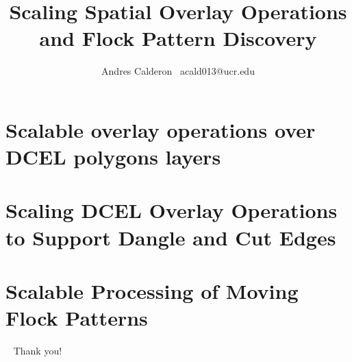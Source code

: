\documentclass{beamer}
\title{\LARGE Scaling Spatial Overlay Operations and Flock Pattern Discovery}
\subtitle{}
\author{
    Andres Calderon \textperiodcentered \ acald013@ucr.edu \\
}
\institute{University of California, Riverside}
\begin{document}
    \begin{frame}
        \maketitle
    \end{frame}

    \section{Scalable overlay operations over DCEL polygons layers}

    


    \section{Scaling DCEL Overlay Operations to Support Dangle and Cut Edges}

    


    \section{Scalable Processing of Moving Flock Patterns}

    


    \begin{frame}{ \ }
        \LARGE Thank you!
    \end{frame}
\end{document}
